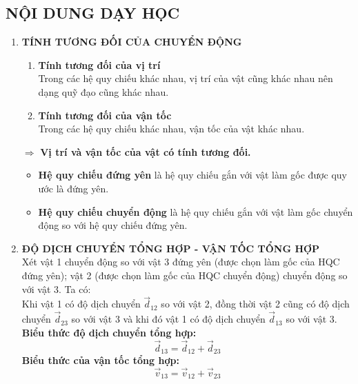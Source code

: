 \subsection{NỘI DUNG DẠY HỌC}
\begin{enumerate}[label=\bfseries\Roman*.]
	\item \textbf{TÍNH TƯƠNG ĐỐI CỦA CHUYỂN ĐỘNG}\\
	\begin{enumerate}[label=\bfseries\arabic*.]
		\item \textbf{Tính tương đối của vị trí}\\
		Trong các hệ quy chiếu khác nhau, vị trí của vật cũng khác nhau nên dạng quỹ đạo cũng khác nhau.
		\item \textbf{Tính tương đối của vận tốc}\\
		Trong các hệ quy chiếu khác nhau, vận tốc của vật khác nhau.
	\end{enumerate}
	$\Rightarrow$ \textbf{Vị trí và vận tốc của vật có tính tương đối.
	 }
	 \begin{itemize}
	 	\item \textbf{Hệ quy chiếu đứng yên} là hệ quy chiếu gắn với vật làm gốc được quy ước là đứng yên.
	 	\item \textbf{Hệ quy chiếu chuyển động} là hệ quy chiếu gắn với vật làm gốc chuyển động so với hệ quy chiếu đứng yên.
	 \end{itemize}
	 \item \textbf{ĐỘ DỊCH CHUYỂN TỔNG HỢP - VẬN TỐC TỔNG HỢP}\\
	 Xét vật 1 chuyển động so với vật 3 đứng yên (được chọn làm gốc của HQC đứng yên); vật 2 (được chọn làm gốc của HQC chuyển động) chuyển động so với vật 3. Ta có:\\
	 Khi vật 1 có độ dịch chuyển $\vec{d}_{12}$ so với vật 2, đồng thời vật 2 cũng có độ dịch chuyển $\vec{d}_{23}$ so với vật 3 và khi đó vật 1 có độ dịch chuyển $\vec{d}_{13}$ so với vật 3.\\
	 \textbf{Biểu thức độ dịch chuyển tổng hợp:}\\
	 $$\vec{d}_{13}=\vec{d}_{12}+\vec{d}_{23}$$
	 \textbf{Biểu thức của vận tốc tổng hợp:}
	 $$\vec{v}_{13}=\vec{v}_{12}+\vec{v}_{23}$$
	 \begin{center}
\end{center}
\end{enumerate}
